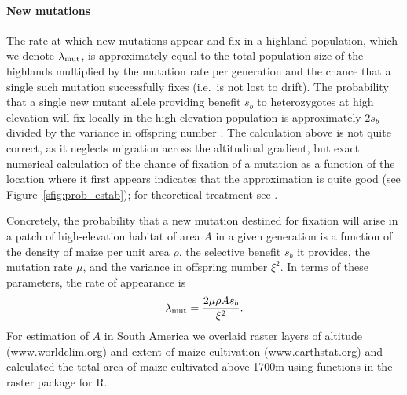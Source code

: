 \paragraph{New mutations}
The rate at which new mutations appear and fix in a highland population, which we denote $\lambda_{\text{mut}}$, 
is approximately equal to the total population size of the highlands multiplied by the mutation rate per generation 
and the chance that a single such mutation successfully fixes (i.e.\ is not lost to drift).
The probability that a single new mutant allele providing benefit $s_b$ to heterozygotes at high elevation will fix locally in the high elevation population is approximately $2s_b$ divided by the variance in offspring number \citep{jagers1975branching}.
The calculation above is not quite correct, as it neglects migration across the altitudinal gradient, but exact numerical calculation of the chance of fixation of a mutation as a function of the location where it first appears indicates that the approximation is quite good (see Figure~\ref{sfig:prob_estab}); for theoretical treatment see \citet{barton1987establishment}.

Concretely, the probability that a new mutation destined for fixation will arise in a patch of high-elevation habitat of area $A$ in a given generation is a function of the density of maize per unit area $\rho$, the selective benefit $s_b$ it provides, the mutation rate $\mu$, and the variance in offspring number $\xi^2$.
In terms of these parameters, the rate of appearance is 
\begin{align} \label{eqn:mutrate}
  \lambda_{\text{mut}} = \frac{2 \mu \rho A s_b}{\xi^2} .
\end{align}
For estimation of $A$ in South America we overlaid raster layers of altitude (\url{www.worldclim.org}) and extent of maize cultivation (\url{www.earthstat.org}) and calculated the total area of maize cultivated above 1700m using functions in the {\sf raster} package for {\sf R}.

